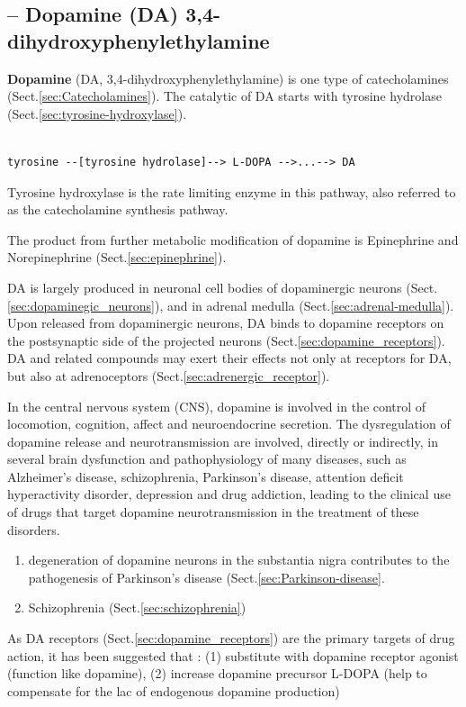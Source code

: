 \subsection{-- Dopamine (DA) 3,4-dihydroxyphenylethylamine}
\label{sec:dopamine}

{\bf Dopamine} (DA, 3,4-dihydroxyphenylethylamine) is one type of catecholamines
(Sect.\ref{sec:Catecholamines}). The catalytic of DA starts with tyrosine
hydrolase (Sect.\ref{sec:tyrosine-hydroxylase}).
\begin{verbatim}

tyrosine --[tyrosine hydrolase]--> L-DOPA -->...--> DA
\end{verbatim}
Tyrosine hydroxylase is the rate limiting enzyme in this pathway, also referred
to as the catecholamine synthesis pathway.  

The product from further metabolic modification of dopamine is Epinephrine and
Norepinephrine (Sect.\ref{sec:epinephrine}).


DA is largely produced in neuronal cell bodies of dopaminergic neurons
(Sect.\ref{sec:dopaminegic_neurons}), and in adrenal medulla
(Sect.\ref{sec:adrenal-medulla}).
Upon released from dopaminergic neurons, DA binds to dopamine receptors on the
postsynaptic side of the projected neurons (Sect.\ref{sec:dopamine_receptors}).
DA and related compounds may exert their effects not only at receptors for DA,
but also at adrenoceptors (Sect.\ref{sec:adrenergic_receptor}).

In the central nervous system (CNS), dopamine is involved in the control of
locomotion, cognition, affect and neuroendocrine secretion. The dysregulation of
dopamine release and neurotransmission are involved, directly or indirectly, in
several brain dysfunction and pathophysiology of many diseases, such as
Alzheimer's disease, schizophrenia, Parkinson's disease, attention deficit
hyperactivity disorder, depression and drug addiction, leading to the clinical
use of drugs that target dopamine neurotransmission in the treatment of these
disorders.
\begin{enumerate}
  \item degeneration of dopamine neurons in the substantia nigra contributes to
  the pathogenesis of Parkinson's disease (Sect.\ref{sec:Parkinson-disease}.
  
  
  \item Schizophrenia (Sect.\ref{sec:schizophrenia})
\end{enumerate}

As DA receptors (Sect.\ref{sec:dopamine_receptors}) are the primary targets of
drug action, it has been suggested that : (1) substitute with dopamine receptor
agonist (function like dopamine), (2) increase dopamine precursor L-DOPA (help
to compensate for the lac of endogenous dopamine production)


